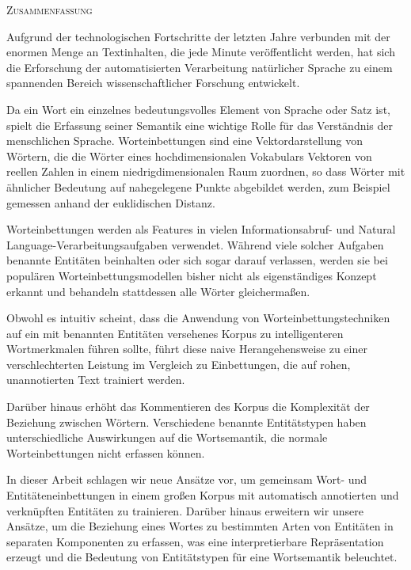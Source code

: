 \begin{center}
  \textsc{Zusammenfassung}
\end{center}
\noindent

Aufgrund der technologischen Fortschritte der letzten Jahre verbunden mit der enormen Menge an Textinhalten, die jede Minute veröffentlicht werden, hat sich die  Erforschung der automatisierten Verarbeitung natürlicher Sprache zu einem spannenden Bereich wissenschaftlicher Forschung entwickelt.

Da ein Wort ein einzelnes bedeutungsvolles Element von Sprache oder Satz ist, spielt die Erfassung seiner Semantik eine wichtige Rolle für das Verständnis der menschlichen Sprache.
Worteinbettungen sind eine Vektordarstellung von Wörtern, die die Wörter eines hochdimensionalen Vokabulars Vektoren von reellen Zahlen in einem niedrigdimensionalen Raum zuordnen, so dass Wörter mit ähnlicher Bedeutung auf nahegelegene Punkte abgebildet werden, zum Beispiel gemessen anhand der euklidischen Distanz.

Worteinbettungen werden als Features in vielen Informationsabruf- und Natural Language-Verarbeitungsaufgaben verwendet. Während viele solcher Aufgaben benannte Entitäten beinhalten oder sich sogar darauf verlassen, werden sie bei populären Worteinbettungsmodellen bisher nicht als eigenständiges Konzept erkannt und behandeln stattdessen alle Wörter gleichermaßen.

Obwohl es intuitiv scheint, dass die Anwendung von Worteinbettungstechniken auf ein mit benannten Entitäten versehenes Korpus zu intelligenteren Wortmerkmalen führen sollte, führt diese naive Herangehensweise zu einer verschlechterten Leistung im Vergleich zu Einbettungen, die auf rohen, unannotierten Text trainiert werden.

Darüber hinaus erhöht das Kommentieren des Korpus die Komplexität der Beziehung zwischen Wörtern. Verschiedene benannte Entitätstypen haben unterschiedliche Auswirkungen auf die Wortsemantik, die normale Worteinbettungen nicht erfassen können.

In dieser Arbeit schlagen wir neue Ansätze vor, um gemeinsam Wort- und Entitäteneinbettungen in einem großen Korpus mit automatisch annotierten und verknüpften Entitäten zu trainieren.
Darüber hinaus erweitern wir unsere Ansätze, um die Beziehung eines Wortes zu bestimmten Arten von Entitäten in separaten Komponenten zu erfassen, was eine interpretierbare Repräsentation erzeugt und die Bedeutung von Entitätstypen für eine Wortsemantik beleuchtet.

